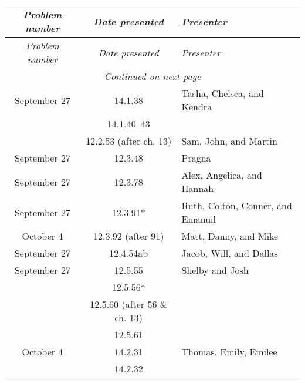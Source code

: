 \documentclass[12pt]{amsart}
\begin{document}
    \begin{longtable}{c|c|l}
        \emph{Problem number} &\emph{Date presented} & \emph{Presenter} \\ \hline
        \endfirsthead
        \emph{Problem number} & \emph{Date presented} & \emph{Presenter} \\ \hline
        \endhead
        \hline
        \multicolumn{3}{c}{\emph{Continued on next page}} \\
        \endfoot
        \hline 
        \endlastfoot
        September 27    & 14.1.38                              & Tasha, Chelsea, and Kendra               \\
                        & 14.1.40--43                          &                                          \\
                        & 12.2.53 (after ch. 13)        & Sam, John, and Martin                    \\
        September 27    & 12.3.48                              & Pragna                                   \\
        September 27    & 12.3.78                              & Alex, Angelica, and Hannah               \\
        September 27    & 12.3.91*                             & Ruth, Colton, Conner, and Emanuil        \\
        October 4       & 12.3.92 (after 91)            & Matt, Danny, and Mike                    \\
        September 27    & 12.4.54ab                            & Jacob, Will, and Dallas                  \\
        September 27    & 12.5.55                              & Shelby and Josh                          \\
                        & 12.5.56*                             &                                          \\
                        & 12.5.60 (after 56 \& ch. 13)  &                                          \\
                        & 12.5.61                              &                                          \\
        October 4       & 14.2.31                              & Thomas, Emily, Emilee                    \\
                        & 14.2.32                              &                                          \\

\end{longtable}
\end{document}
